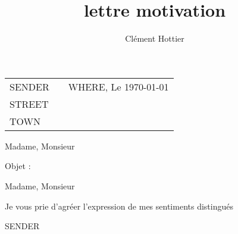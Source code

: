\documentclass[12pt]{article}
\author{Clément Hottier}
\date{}
\title{lettre motivation}
\begin{document}
\setlength{\parindent}{0pt}
\setlength{\parskip}{8pt}
\pagestyle{empty}


\begin{tabularx}{\linewidth}{@{} l X l @{}}
  SENDER& &WHERE, Le \today \\
  STREET & & \\
  TOWN & &
\end{tabularx}

\vspace{1cm}
\begin{flushright}
  Madame, Monsieur
\end{flushright}

\vspace{1cm}

Objet : 
\vspace{0.8cm}

Madame, Monsieur 




\vspace{0.5cm}
Je vous prie d'agréer l'expression 
de mes sentiments distingués

\vfill
\hspace{0.63\textwidth} SENDER 
\vfill
\end{document}

